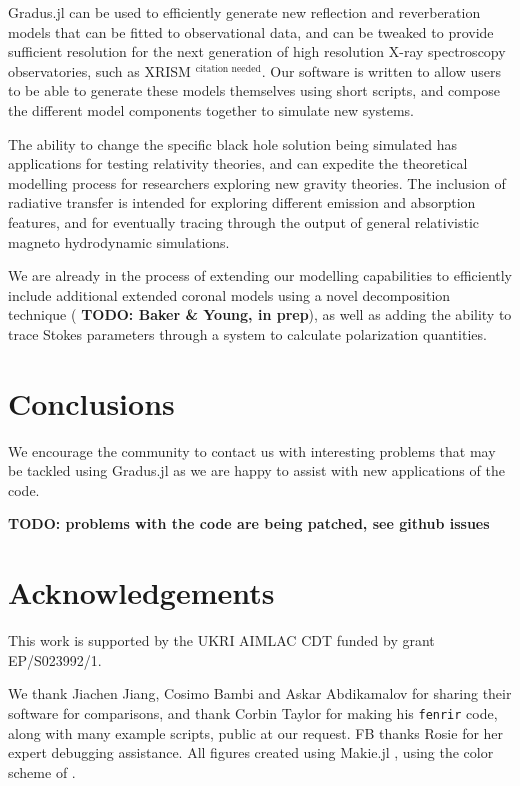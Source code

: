 \documentclass[fleqn,usenatbib]{mnras}
\newcommand{\citneeded}{{\bf \color{red} $^{\text{citation needed}}$}}
\newcommand{\todo}[1]{{\noindent \bf \color{red} TODO: #1}}
\newcommand{\Gradus}{Gradus.jl\xspace}
\begin{document}
\Gradus can be used to efficiently generate new reflection and reverberation
models that can be fitted to observational data, and can be tweaked to provide
sufficient resolution for the next generation of high resolution X-ray
spectroscopy observatories, such as XRISM\citneeded. Our software is written to
allow users to be able to generate these models themselves using short scripts,
and compose the different model components together to simulate new systems.

The ability to change the specific black hole solution being simulated has
applications for testing relativity theories, and can expedite the theoretical
modelling process for researchers exploring new gravity theories. The inclusion
of radiative transfer is intended for exploring different emission and
absorption features, and for eventually tracing through the output of general
relativistic magneto hydrodynamic simulations.

We are already in the process of extending our modelling capabilities to
efficiently include additional extended coronal models using a novel
decomposition technique (\todo{Baker \& Young, in prep}), as well as adding
the ability to trace Stokes parameters through a system to calculate
polarization quantities.

\section{Conclusions}
\label{sec:conclusion}

We encourage the community to contact us with interesting problems that may be tackled using \Gradus as we are happy to assist with new applications of the code.

\todo{problems with the code are being patched, see github issues}

\section*{Acknowledgements}
This work is supported by the UKRI AIMLAC CDT funded by grant EP/S023992/1.

We thank Jiachen Jiang, Cosimo Bambi and Askar Abdikamalov for sharing their
software for comparisons, and thank Corbin Taylor for making his
\texttt{fenrir} code, along with many example scripts, public at our request. FB thanks Rosie for her expert debugging assistance. All figures created using Makie.jl \citep{DanischKrumbiegel2021}, using the color scheme of \cite{wong_points_2011}.
\end{document}
